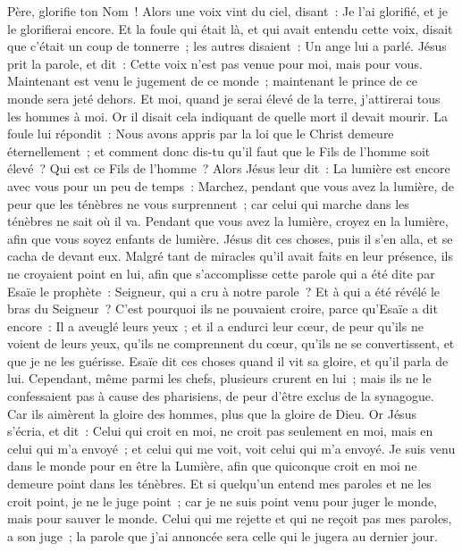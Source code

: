 \begin{multicols}{2}
Père, glorifie ton Nom~! Alors une voix vint du ciel, disant~: Je l'ai glorifié, et je le glorifierai encore.
Et la foule qui était là, et qui avait entendu cette voix, disait que c'était un coup de tonnerre~; les autres disaient~: Un ange lui a parlé.
Jésus prit la parole, et dit~: Cette voix n'est pas venue pour moi, mais pour vous.
Maintenant est venu le jugement de ce monde~; maintenant le prince de ce monde sera jeté dehors.
Et moi, quand je serai élevé de la terre, j'attirerai tous les hommes à moi.
Or il disait cela indiquant de quelle mort il devait mourir.
La foule lui répondit~: Nous avons appris par la loi que le Christ demeure éternellement~; et comment donc dis-tu qu'il faut que le Fils de l'homme soit élevé~? Qui est ce Fils de l'homme~?
Alors Jésus leur dit~: La lumière est encore avec vous pour un peu de temps~: Marchez, pendant que vous avez la lumière, de peur que les ténèbres ne vous surprennent~; car celui qui marche dans les ténèbres ne sait où il va.
Pendant que vous avez la lumière, croyez en la lumière, afin que vous soyez enfants de lumière. Jésus dit ces choses, puis il s'en alla, et se cacha de devant eux.
Malgré tant de miracles qu'il avait faits en leur présence, ils ne croyaient point en lui,
afin que s'accomplisse cette parole qui a été dite par Esaïe le prophète~: Seigneur, qui a cru à notre parole~? Et à qui a été révélé le bras du Seigneur~?
C'est pourquoi ils ne pouvaient croire, parce qu'Esaïe a dit encore~:
Il a aveuglé leurs yeux~; et il a endurci leur cœur, de peur qu'ils ne voient de leurs yeux, qu'ils ne comprennent du cœur, qu'ils ne se convertissent, et que je ne les guérisse.
Esaïe dit ces choses quand il vit sa gloire, et qu'il parla de lui.
Cependant, même parmi les chefs, plusieurs crurent en lui~; mais ils ne le confessaient pas à cause des pharisiens, de peur d'être exclus de la synagogue.
Car ils aimèrent la gloire des hommes, plus que la gloire de Dieu.
Or Jésus s'écria, et dit~: Celui qui croit en moi, ne croit pas seulement en moi, mais en celui qui m'a envoyé~;
et celui qui me voit, voit celui qui m'a envoyé.
Je suis venu dans le monde pour en être la Lumière, afin que quiconque croit en moi ne demeure point dans les ténèbres.
Et si quelqu'un entend mes paroles et ne les croit point, je ne le juge point~; car je ne suis point venu pour juger le monde, mais pour sauver le monde.
Celui qui me rejette et qui ne reçoit pas mes paroles, a son juge~; la parole que j'ai annoncée sera celle qui le jugera au dernier jour.

\end{multicols}
